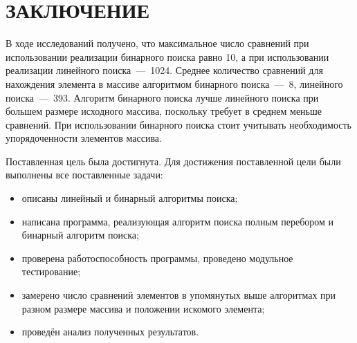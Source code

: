 \chapter*{\hfill{\centering  ЗАКЛЮЧЕНИЕ}\hfill}

В ходе исследований получено, что максимальное число сравнений при использовании реализации бинарного поиска равно 10, а при использовании реализации линейного поиска~---~1024. Среднее количество сравнений для нахождения элемента в массиве алгоритмом бинарного поиска~---~8, линейного поиска~---~393. Алгоритм бинарного поиска лучше линейного поиска при большем размере исходного массива, поскольку требует в среднем меньше сравнений. При использовании бинарного поиска стоит учитывать необходимость упорядоченности элементов массива.

Поставленная цель была достигнута.
Для достижения поставленной цели были выполнены все поставленные задачи:
\begin{itemize}[label=---]
	\item описаны линейный и бинарный алгоритмы поиска;
	\item написана программа, реализующая алгоритм поиска полным перебором и бинарный алгоритм поиска;
	\item проверена работоспособность программы, проведено модульное тестирование;
	\item замерено число сравнений элементов в упомянутых выше алгоритмах при разном размере массива и положении искомого элемента;
	\item проведён анализ полученных результатов.
\end{itemize}
